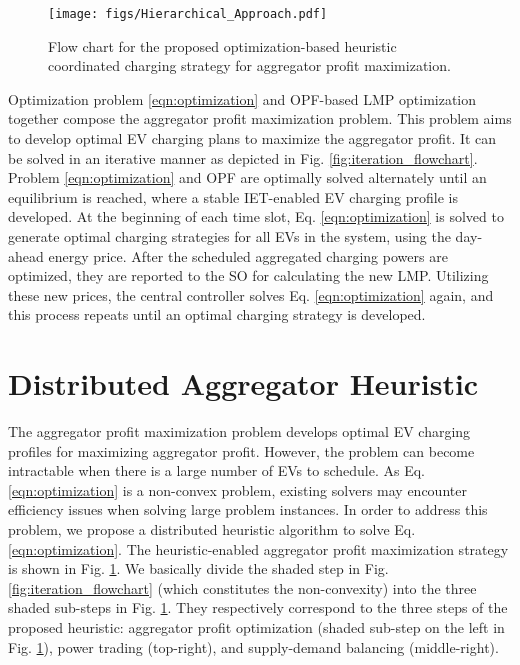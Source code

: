 \documentclass[conference]{IEEEtran}
\begin{document}
	\begin{figure}
		\centering
		\texttt{[image: figs/Hierarchical\_Approach.pdf]}
        \vspace*{-3mm}
		\caption{Flow chart for the proposed optimization-based heuristic coordinated charging strategy for aggregator profit maximization.}
        \vspace*{-6mm}
		\label{fig:flowchart}
	\end{figure}
    
    Optimization problem \eqref{eqn:optimization} and OPF-based LMP optimization together compose the aggregator profit maximization problem. This problem aims to develop optimal EV charging plans to maximize the aggregator profit. It can be solved in an iterative manner as depicted in Fig. \ref{fig:iteration_flowchart}. Problem \eqref{eqn:optimization} and OPF are optimally solved alternately until an equilibrium is reached, where a stable IET-enabled EV charging profile is developed. At the beginning of each time slot, Eq. \eqref{eqn:optimization} is solved to generate optimal charging strategies for all EVs in the system, using the day-ahead energy price.
After the scheduled aggregated charging powers are optimized, they are reported to the SO for calculating the new LMP. Utilizing these new prices, the central controller solves Eq. \eqref{eqn:optimization} again, and this process repeats until an optimal charging strategy is developed.

	\vspace*{-0.1cm}
	\section{Distributed Aggregator Heuristic}
	\vspace*{-0.1cm}
		
	The aggregator profit maximization problem develops optimal EV charging profiles for maximizing aggregator profit. However, the problem can become intractable when there is a large number of EVs to schedule. As Eq. \eqref{eqn:optimization} is a non-convex problem, existing solvers may encounter efficiency issues when solving large problem instances. In order to address this problem, we propose a distributed heuristic algorithm to solve Eq. \eqref{eqn:optimization}. The heuristic-enabled aggregator profit maximization strategy is shown in Fig. \ref{fig:flowchart}. We basically divide the shaded step in Fig. \ref{fig:iteration_flowchart} (which constitutes the non-convexity) into the three shaded sub-steps in Fig. \ref{fig:flowchart}. They respectively correspond to the three steps of the proposed heuristic: aggregator profit optimization (shaded sub-step on the left in Fig. \ref{fig:flowchart}), power trading (top-right), and supply-demand balancing (middle-right).
	
\end{document}
